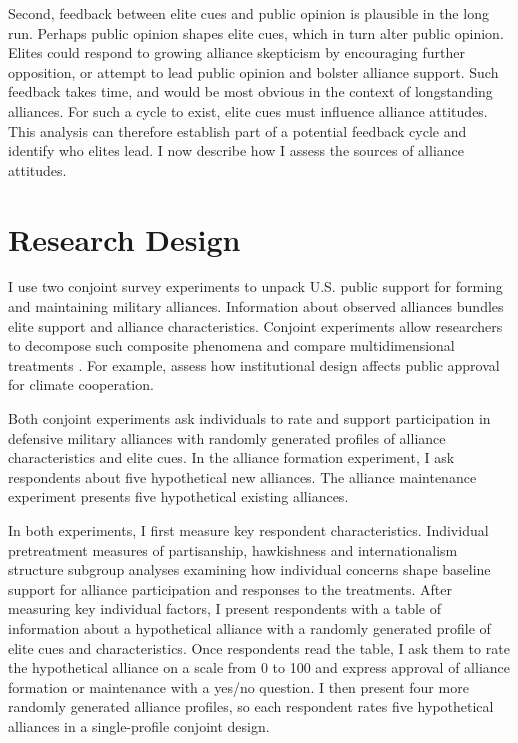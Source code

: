 \documentclass[12pt]{article}
\begin{document}
Second, feedback between elite cues and public opinion is plausible in the long run. 
Perhaps public opinion shapes elite cues, which in turn alter public opinion. 
Elites could respond to growing alliance skepticism by encouraging further opposition, or attempt to lead public opinion and bolster alliance support.
Such feedback takes time, and would be most obvious in the context of longstanding alliances.
For such a cycle to exist, elite cues must influence alliance attitudes.
This analysis can therefore establish part of a potential feedback cycle and identify who elites lead.  
I now describe how I assess the sources of alliance attitudes. 



\section{Research Design}


I use two conjoint survey experiments to unpack U.S. public support for forming and maintaining military alliances. 
Information about observed alliances bundles elite support and alliance characteristics. 
Conjoint experiments allow researchers to decompose such composite phenomena and compare multidimensional treatments \citep{Hainmuelleretal2014}. 
For example, \citet{BechtelScheve2013} assess how institutional design affects public approval for climate cooperation. 


Both conjoint experiments ask individuals to rate and support participation in defensive military alliances with randomly generated profiles of alliance characteristics and elite cues. 
In the alliance formation experiment, I ask respondents about five hypothetical new alliances. 
The alliance maintenance experiment presents five hypothetical existing alliances.


In both experiments, I first measure key respondent characteristics.  
Individual pretreatment measures of partisanship, hawkishness and internationalism structure subgroup analyses examining how individual concerns shape baseline support for alliance participation and responses to the treatments. 
After measuring key individual factors, I present respondents with a table of information about a hypothetical alliance with a randomly generated profile of elite cues and characteristics.
Once respondents read the table, I ask them to rate the hypothetical alliance on a scale from 0 to 100 and express approval of alliance formation or maintenance with a yes/no question. 
I then present four more randomly generated alliance profiles, so each respondent rates five hypothetical alliances in a single-profile conjoint design.%
\end{document}
